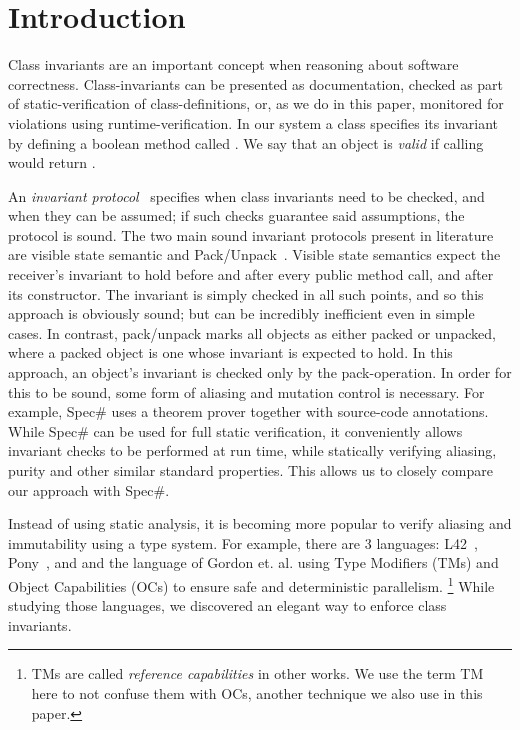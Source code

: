 \section{Introduction}
Class invariants are an important concept when reasoning about software correctness.
Class-invariants can be presented as documentation, checked as part of static-verification of class-definitions, or, as we do in this paper, monitored for violations using runtime-verification.
In our system a class specifies its invariant by defining a boolean method called \Q@invariant@. We say that an object is \emph{valid} if calling \Q@invariant@ would return \Q@true@.

An \emph{invariant protocol}~\cite{FlexibleInvariants} specifies when class invariants need to be checked, and when they can be assumed; if such checks guarantee said assumptions, the protocol is sound.
The two main sound invariant protocols present in literature are visible state semantic \cite{Meyer:1988:OSC:534929} and Pack/Unpack~\cite{DBLP:journals/jot/BarnettDFLS04}. Visible state semantics expect the receiver's invariant to hold before and after every public method call, and after its constructor. The invariant is simply checked in all such points, and so this approach is obviously sound; but can be incredibly inefficient even in simple cases.
In contrast, pack/unpack marks all objects as either packed or unpacked, where a packed object is one whose invariant is expected to hold.
In this approach, an object's invariant is checked only by the pack-operation.
In order for this to be sound, some form of aliasing and mutation control is necessary. For example, Spec\# uses a theorem prover together with source-code annotations.
While Spec\# can be used for full static verification, it conveniently allows invariant checks to be performed
at run time, while statically verifying aliasing, purity and other similar standard properties.
This allows us to closely compare our approach with Spec\#.

Instead of using static analysis, 
it is becoming more popular to verify aliasing and immutability using a type system.
For example, there are 3 languages: L42~\cite{ServettoZucca15,ServettoEtAl13a,JOT:issue_2011_01/article1,GianniniEtAl16}, Pony~\cite{clebsch2015deny,clebsch2017orca}, and and the language of Gordon et. al.\cite{GordonEtAl12} using Type Modifiers (TMs) and Object Capabilities (OCs) to ensure safe and deterministic parallelism.%
\footnote{TMs are called \emph{reference capabilities} in other works. We use the term TM here
to not confuse them with OCs, another technique we also use in this paper.}
While studying those languages, we discovered an elegant way to enforce class invariants.

